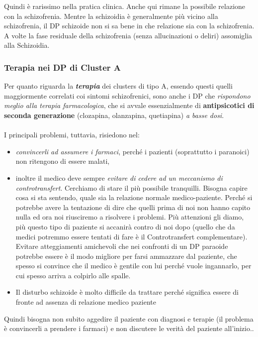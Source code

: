Quindi è rarissimo nella pratica clinica. Anche qui rimane la possibile
relazione con la schizofrenia. Mentre la schizoidia è generalmente più
vicino alla schizofrenia, il DP schizoide non si sa bene in che
relazione sia con la schizofrenia. A volte la fase residuale della
schizofrenia (senza allucinazioni o deliri) assomiglia alla Schizoidia.

\subsubsection{Terapia nei DP di Cluster A}

Per quanto riguarda la \textbf{\emph{terapia}} dei clusters di tipo A,
essendo questi quelli maggiormente correlati coi sintomi schizofrenici,
sono anche i DP che \emph{rispondono meglio alla terapia farmacologica},
che si avvale essenzialmente di \textbf{antipsicotici di seconda
generazione} (clozapina, olanzapina, quetiapina) \emph{a basse dosi}.
\\\\
I principali problemi, tuttavia, risiedono nel:

\begin{itemize}
\item
  \emph{convincerli ad assumere i farmaci}, perché i pazienti
  (soprattutto i paranoici) non ritengono di essere malati,
\item
  inoltre il medico deve sempre \emph{evitare di cedere ad un meccanismo
  di controtransfert}. Cerchiamo di stare il più possibile tranquilli.
  Bisogna capire cosa si sta sentendo, quale sia la relazione normale
  medico-paziente. Perché si potrebbe avere la tentazione di dire che
  quelli prima di noi non hanno capito nulla ed ora noi riusciremo a
  risolvere i problemi. Più attenzioni gli diamo, più questo tipo di
  paziente si accanirà contro di noi dopo (quello che da medici potremmo
  essere tentati di fare è il Controtransfert complementare). Evitare
  atteggiamenti amichevoli che nei confronti di un DP paraoide potrebbe
  essere è il modo migliore per farsi ammazzare dal paziente, che spesso
  si convince che il medico è gentile con lui perché vuole ingannarlo,
  per cui spesso arriva a colpirlo alle spalle.
\item
  Il disturbo schizoide è molto difficile da trattare perché significa
  essere di fronte ad assenza di relazione medico paziente
\end{itemize}

Quindi bisogna non subito aggedire il paziente con diagnosi e terapie
(il problema è convincerli a prendere i farmaci) e non discutere le
verità del paziente all'inizio..


